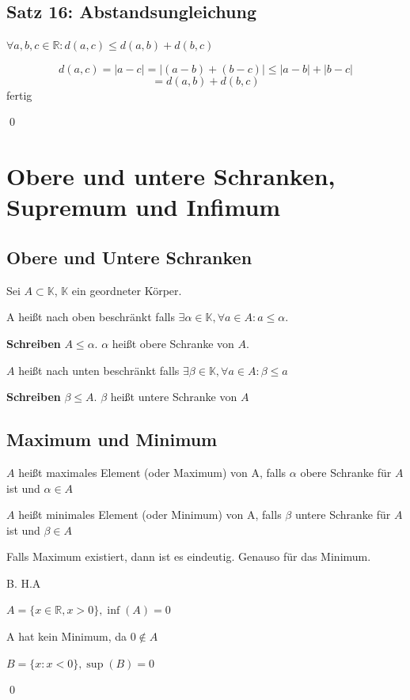 \documentclass[fleqn]{scrbook}
\newcommand{\R}{\mathbb{R}}
\renewenvironment{proof}{{\bfseries Beweis }}{\qed}
\begin{document}
\subsection{Satz 16: Abstandsungleichung}

$\forall a,b,c \in \R: d(a,c) \leq d(a,b)+d(b,c)$

\begin{proof}

\[d(a,c)=|a-c|=|(a-b)+(b-c)| \leq |a-b|+|b-c|\]
\[=d(a,b)+d(b,c)\]
fertig

\end{proof}

\section{Obere und untere Schranken, Supremum und Infimum}

\subsection{Obere und Untere Schranken}

Sei $A \subset \mathbb{K}$, $\mathbb{K}$ ein geordneter Körper.

A heißt nach oben beschränkt falls $ \exists \alpha \in \mathbb{K}, \forall a \in A : a \leq \alpha$.

\textbf{Schreiben} $A \leq \alpha$. $\alpha$ heißt obere Schranke von $A$.

$A$ heißt nach unten beschränkt falls $\exists \beta \in \mathbb{K},\forall a \in A: \beta \leq a$

\textbf{Schreiben} $\beta \leq A$. $\beta$ heißt untere Schranke von $A$

\subsection{Maximum und Minimum}

$A$ heißt maximales Element (oder Maximum) von A, falls $\alpha$ obere 
Schranke für $A$ ist und $\alpha \in A$

$A$ heißt minimales Element (oder Minimum) von A, falls $\beta$ untere Schranke für $A$ ist und $\beta \in A$

\begin{proof}
Falls Maximum existiert, dann ist es eindeutig. Genauso für das Minimum. 

B. \quad H.A %

$A=\{x \in \R, x>0\}, \inf(A)=0$

A hat kein Minimum, da $0 \notin A$

$B=\{x:x<0\}, \sup(B)=0$

\end{proof}
\end{document}
